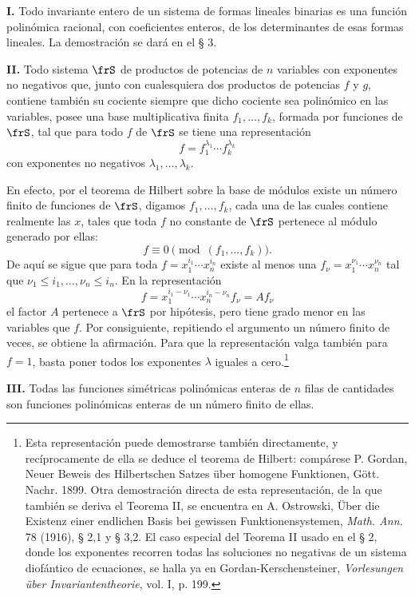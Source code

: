 \documentclass[11pt]{article}
\begin{document}
\textbf{I.} Todo invariante entero de un sistema de formas lineales binarias es una función polinómica racional, con coeficientes enteros, de los determinantes de esas formas lineales. La demostración se dará en el § 3.

\textbf{II.} Todo sistema \(\frS\) de productos de potencias de \(n\) variables con exponentes no negativos que, junto con cualesquiera dos productos de potencias \(f\) y \(g\), contiene también su cociente siempre que dicho cociente sea polinómico en las variables, posee una base multiplicativa finita \(f_1,\ldots,f_k\), formada por funciones de \(\frS\), tal que para todo \(f\) de \(\frS\) se tiene una representación
\[
        f=f_1^{\lambda_1}\cdots f_k^{\lambda_k}
\]
con exponentes no negativos \(\lambda_1,\ldots,\lambda_k\).

En efecto, por el teorema de Hilbert sobre la base de módulos existe un número finito de funciones de \(\frS\), digamos \(f_1,\ldots,f_k\), cada una de las cuales contiene realmente las \(x\), tales que toda \(f\) no constante de \(\frS\) pertenece al módulo generado por ellas:
\[
        f\equiv0\pmod{(f_1,\ldots,f_k)}.
\]
De aquí se sigue que para toda \(f=x_1^{i_1}\cdots x_n^{i_n}\) existe al menos una \(f_\nu=x_1^{\nu_1}\cdots x_n^{\nu_n}\) tal que \(\nu_1\le i_1,\ldots,\nu_n\le i_n\). En la representación
\[
        f=x_1^{i_1-\nu_1}\cdots x_n^{i_n-\nu_n} f_\nu = A f_\nu
\]
el factor \(A\) pertenece a \(\frS\) por hipótesis, pero tiene grado menor en las variables que \(f\). Por consiguiente, repitiendo el argumento un número finito de veces, se obtiene la afirmación. Para que la representación valga también para \(f=1\), basta poner todos los exponentes \(\lambda\) iguales a cero.\footnote{Esta representación puede demostrarse también directamente, y recíprocamente de ella se deduce el teorema de Hilbert: compárese P. Gordan, Neuer Beweis des Hilbertschen Satzes über homogene Funktionen, Gött. Nachr. 1899. Otra demostración directa de esta representación, de la que también se deriva el Teorema II, se encuentra en A. Ostrowski, Über die Existenz einer endlichen Basis bei gewissen Funktionensystemen, \emph{Math. Ann.} 78 (1916), § 2,1 y § 3,2. El caso especial del Teorema II usado en el § 2, donde los exponentes recorren todas las soluciones no negativas de un sistema diofántico de ecuaciones, se halla ya en Gordan-Kerschensteiner, \emph{Vorlesungen über Invariantentheorie}, vol. I, p. 199.}

\textbf{III.} Todas las funciones simétricas polinómicas enteras de \(n\) filas de cantidades son funciones polinómicas enteras de un número finito de ellas.
\end{document}
